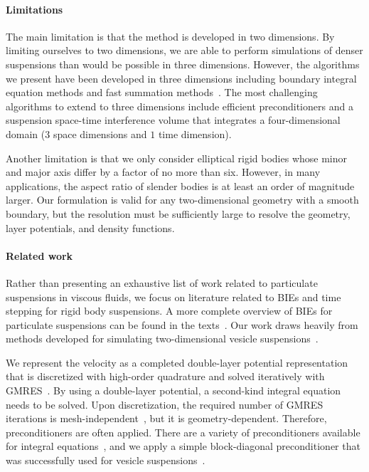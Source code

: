\documentclass[AMA,STIX1COL]{WileyNJD-v2}
\begin{document}
\paragraph{Limitations} The main limitation is that the method is
developed in two dimensions.  By limiting ourselves to two dimensions,
we are able to perform simulations of denser suspensions  than would be
possible in three dimensions.  However, the algorithms we present have
been developed in three dimensions including boundary integral equation
methods and fast summation methods~\cite{cor-gre-rac-vee2017,
kli-tor2014, kli-tor2016}.  The most challenging algorithms to extend to
three dimensions include efficient preconditioners and a suspension
space-time interference volume that integrates a four-dimensional domain
($3$ space dimensions and $1$ time dimension).

Another limitation is that we only consider elliptical rigid bodies
whose minor and major axis differ by a factor of no more than six.
However, in many applications, the aspect ratio of slender bodies is at
least an order of magnitude larger.  Our formulation is valid for any
two-dimensional geometry with a smooth boundary, but the resolution must
be sufficiently large to resolve the geometry, layer potentials, and
density functions.

\paragraph{Related work} Rather than presenting an exhaustive list of
work related to particulate suspensions in viscous fluids, we focus on
literature related to BIEs and time stepping for rigid body suspensions.
A more complete overview of BIEs for particulate suspensions can be
found in the texts~\cite{Pozrikidis1992, Guazzelli2011, Karrila1991}.
Our work draws heavily from methods developed for simulating
two-dimensional vesicle suspensions~\cite{Quaife2014, Quaife2015,
qua-bir2016, Rahimian2010, Lu2017}.  

We represent the velocity as a completed double-layer potential
representation~\cite{Power1987, Power1993, Karrila1989} that is
discretized with high-order quadrature and solved iteratively with
GMRES~\cite{Saad1986}.  By using a double-layer potential, a second-kind
integral equation needs to be solved.  Upon discretization, the required
number of GMRES iterations is mesh-independent~\cite{Campbell1996}, but
it is geometry-dependent.  Therefore, preconditioners are often applied.
There are a variety of preconditioners available for integral
equations~\cite{cou-pou-dar2017, che2000, qua-cou-dar2018, Quaife2015a,
bra-lub1990, hem-sch1981}, and we apply a simple block-diagonal
preconditioner that was successfully used for vesicle
suspensions~\cite{Quaife2014}.
\end{document}
